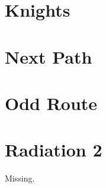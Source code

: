 \documentclass[a4paper, 10pt]{article}
\let\stdsection\section
\renewcommand\section{\newpage\stdsection}
\newcommand{\includecode}[1]{
    }
\begin{document}
    
    \section{Knights}
        \includecode{../problems/w13/Knights/Knights1.cpp}
        
    \section{Next Path}
        \includecode{../problems/w13/NextPath/NextPath1.cpp}
        
    \section{Odd Route}
        \includecode{../problems/w13/OddRoute/OddRoute1.cpp}
        
    \section{Radiation 2}
        Missing.
    
\end{document}
